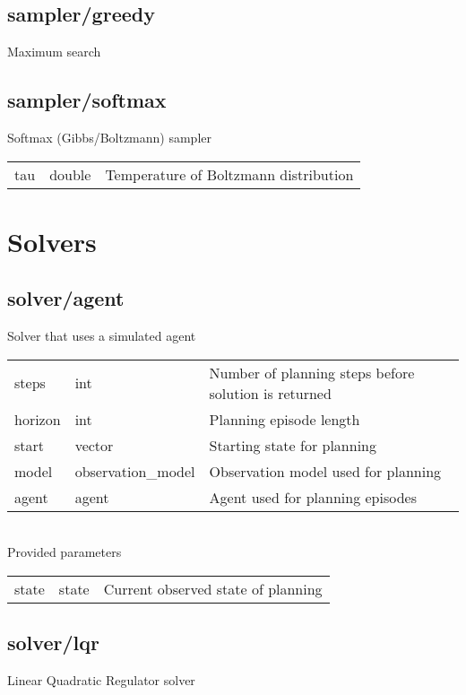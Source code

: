 \subsection{sampler/greedy}
\noindent Maximum search\\

\subsection{sampler/softmax}
\noindent Softmax (Gibbs/Boltzmann) sampler\\

\noindent\begin{tabular}{@{}lll@{}}
tau&double&Temperature of Boltzmann distribution\\
\end{tabular}
\section{Solvers}
\subsection{solver/agent}
\noindent Solver that uses a simulated agent\\

\noindent\begin{tabular}{@{}lll@{}}
steps&int&Number of planning steps before solution is returned\\
horizon&int&Planning episode length\\
start&vector&Starting state for planning\\
model&observation\_model&Observation model used for planning\\
agent&agent&Agent used for planning episodes\\
\end{tabular}
\\

\noindent Provided parameters\\

\noindent\begin{tabular}{@{}lll@{}}
state&state&Current observed state of planning\\
\end{tabular}
\subsection{solver/lqr}
\noindent Linear Quadratic Regulator solver\\


